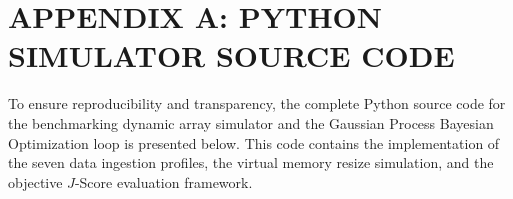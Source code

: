 \chapter*{APPENDIX A: PYTHON SIMULATOR SOURCE CODE}

To ensure reproducibility and transparency, the complete Python source code for 
the benchmarking dynamic array simulator and the Gaussian Process Bayesian 
Optimization loop is presented below. This code contains the implementation of 
the seven data ingestion profiles, the virtual memory resize simulation, and 
the objective $J$-Score evaluation framework.


